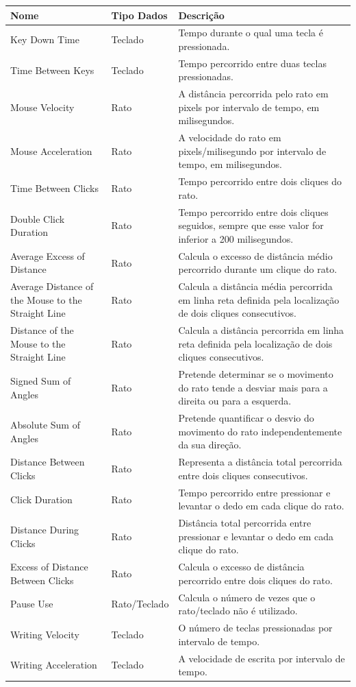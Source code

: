 \begin{center}
    \begin{longtable}{ | p{4cm} | l | p{7cm} |}
    \hline
    Nome & Tipo Dados & Descrição \\ \hline
    Key Down Time & Teclado & Tempo durante o qual uma tecla é pressionada. \\ \hline    		    Time Between Keys & Teclado & Tempo percorrido entre duas teclas pressionadas. \\ \hline
    Mouse Velocity & Rato & A distância percorrida pelo rato em pixels por intervalo de tempo, em milisegundos. \\ \hline
    Mouse Acceleration & Rato & A velocidade do rato em pixels/milisegundo por intervalo de tempo, em milisegundos. \\ \hline
    Time Between Clicks & Rato & Tempo percorrido entre dois cliques do rato. \\ \hline
    Double Click Duration & Rato & Tempo percorrido entre dois cliques seguidos, sempre que esse valor for inferior a 200 milisegundos. \\ \hline
    Average Excess of Distance & Rato & Calcula o excesso de distância médio percorrido durante um clique do rato. \\ \hline
    Average Distance of the Mouse to the Straight Line & Rato & Calcula a distância média percorrida em linha reta definida pela localização de dois cliques consecutivos. \\ \hline
    Distance of the Mouse to the Straight Line & Rato & Calcula a distância percorrida em linha reta definida pela localização de dois cliques consecutivos. \\ \hline
    Signed Sum of Angles & Rato & Pretende determinar se o movimento do rato tende a desviar mais para a direita ou para a esquerda. \\ \hline
    Absolute Sum of Angles & Rato & Pretende quantificar o desvio do movimento do rato independentemente da sua direção. \\ \hline
    Distance Between Clicks & Rato & Representa a distância total percorrida entre dois cliques consecutivos. \\ \hline
    Click Duration & Rato  & Tempo percorrido entre pressionar e levantar o dedo em cada clique do rato. \\ \hline
   Distance During Clicks &  Rato &  Distância total percorrida entre pressionar e levantar o dedo em cada clique do rato.\\ \hline
   Excess of Distance Between Clicks & Rato  & Calcula o excesso de distância percorrido entre dois cliques do rato. \\ \hline
   Pause Use & Rato/Teclado  & Calcula o número de vezes que o rato/teclado não é utilizado. \\ \hline
   Writing Velocity & Teclado  & O número de teclas pressionadas por intervalo de tempo. \\ \hline
   Writing Acceleration & Teclado  & A velocidade de escrita por intervalo de tempo. \\ \hline
    \end{longtable}


\end{center}
